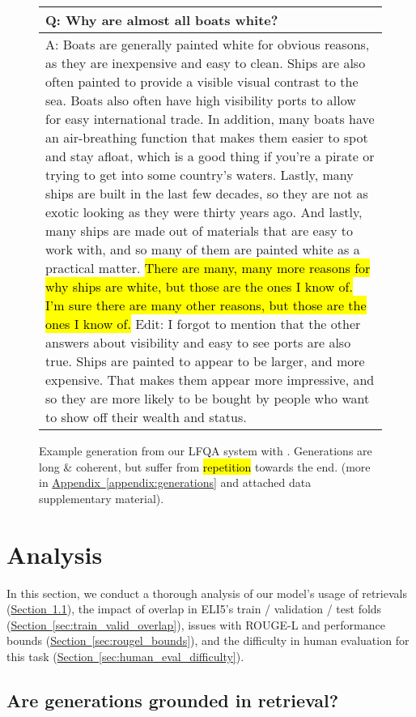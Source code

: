 \documentclass[11pt]{article}
\newcommand{\namedref}[2]{\hyperref[#2]{#1~\ref*{#2}}}
\newcommand{\sectionref}[1]{\namedref{Section}{#1}}
\newcommand{\appendixref}[1]{\namedref{Appendix}{#1}}
\begin{document}
\begin{figure}[t]
    \footnotesize
    \centering
\begin{tabular}{p{}}
    \toprule
  Q: Why are almost all boats white?\\
  \midrule
  A: Boats are generally painted white for obvious reasons, as they are inexpensive and easy to clean. Ships are also often painted to provide a visible visual contrast to the sea. Boats also often have high visibility ports to allow for easy international trade. In addition, many boats have an air-breathing function that makes them easier to spot and stay afloat, which is a good thing if you're a pirate or trying to get into some country's waters. Lastly, many ships are built in the last few decades, so they are not as exotic looking as they were thirty years ago. And lastly, many ships are made out of materials that are easy to work with, and so many of them are painted white as a practical matter. \hl{There are many, many more reasons for why ships are white, but those are the ones I know of. I'm sure there are many other reasons, but those are the ones I know of.} Edit: I forgot to mention that the other answers about visibility and easy to see ports are also true. Ships are painted to appear to be larger, and more expensive. That makes them appear more impressive, and so they are more likely to be bought by people who want to show off their wealth and status.\\
  \bottomrule
       \end{tabular}
\caption{Example generation from our LFQA system with . Generations are long \& coherent, but suffer from \hl{repetition} towards the end. (more in \appendixref{appendix:generations} and attached data supplementary material).}
    \label{fig:generations_main}
\end{figure}
 \section{Analysis}
\label{sec:analysis_main}

In this section, we conduct a thorough analysis of our model's usage of retrievals (\sectionref{sec:grounding}), the impact of overlap in ELI5's train / validation / test folds (\sectionref{sec:train_valid_overlap}), issues with ROUGE-L and performance bounds (\sectionref{sec:rougel_bounds}), and the difficulty in human evaluation for this task (\sectionref{sec:human_eval_difficulty}).
\subsection{Are generations grounded in retrieval?}
\label{sec:grounding}
\end{document}
